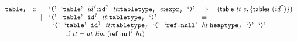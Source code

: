 \vspace{1ex}

$$
\begin{array}[t]{@{}lrrl@{}l@{}l@{}l@{}}
& {{\mathtt{table}}}_{I} & ::= & \mbox{‘\texttt{{(}}’}~~\mbox{‘\texttt{table}’}~~{{\mathit{id}}^?}{:}{{\mathtt{id}}^?}~~{\mathit{tt}}{:}{{\mathtt{tabletype}}}_{I}~~e{:}{{\mathtt{expr}}}_{I}~~\mbox{‘\texttt{{)}}’} & \quad\Rightarrow\quad{} & (\mathsf{table}~{\mathit{tt}}~e, \{ \mathsf{tables}~({{\mathit{id}}^?}) \}) \\
& & | & \mbox{‘\texttt{{(}}’}~~\mbox{‘\texttt{table}’}~~{{\mathtt{id}}^?}~~{\mathit{tt}}{:}{{\mathtt{tabletype}}}_{I}~~\mbox{‘\texttt{{)}}’} & \quad\equiv\quad{} & & \\
&&& \multicolumn{4}{@{}l@{}}{\quad
\begin{array}[t]{@{}l@{}l@{}l@{}}
\mbox{‘\texttt{{(}}’}~~\mbox{‘\texttt{table}’}~~{{\mathtt{id}}^?}~~{\mathit{tt}}{:}{{\mathtt{tabletype}}}_{I}~~\mbox{‘\texttt{{(}}’}~~\mbox{‘\texttt{ref.null}’}~~{\mathit{ht}}{:}{{\mathtt{heaptype}}}_{I}~~\mbox{‘\texttt{{)}}’}~~\mbox{‘\texttt{{)}}’} & & \\
 \multicolumn{3}{@{}l@{}}{\quad
\begin{array}[t]{@{}l@{}}
\quad \mbox{if}~ {\mathit{tt}} = {\mathit{at}}~{\mathit{lim}}~(\mathsf{ref}~{\mathsf{null}^?}~{\mathit{ht}}) \\
\end{array}
} \\
\end{array}
} \\
\end{array}
$$

\vspace{1ex}

